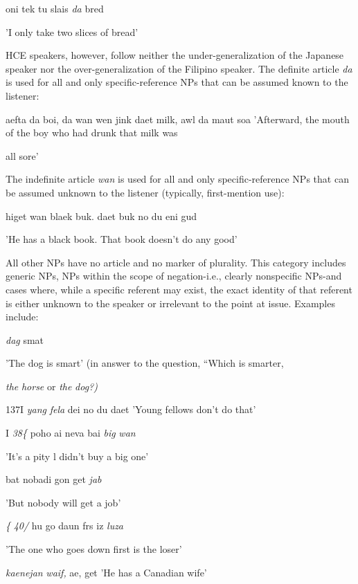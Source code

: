 \ea\label{ex:33}
oni tek tu slais \textit{da} bred
\glt
\z

'I only take two slices of bread'

HCE speakers, however, follow neither the under-generalization of the Japanese speaker nor the over-generalization of the Filipino speaker. The definite article \textit{da} is used for all and only specific-refer\-ence NPs that can be assumed known to the listener:

\ea\label{ex:34}
aefta da boi, da wan wen jink daet milk, awl da maut soa 'Afterward, the mouth of the boy who had drunk that milk was
\glt
\z

all sore'

The indefinite article \textit{wan} is used for all and only specific-reference NPs that can be assumed unknown to the listener (typically, first-mention use):

\ea\label{ex:35}
higet wan blaek buk. daet buk no du eni gud
\glt
\z

'He has a black book. That book doesn't do any good'

All other NPs have no article and no marker of plurality. This category includes generic NPs, NPs within the scope of negation-i.e., clearly nonspecific NPs-and cases where, while a specific referent may exist, the exact identity of that referent is either unknown to the speaker or irrelevant to the point at issue. Examples include:

\ea\label{ex:36}
\textit{dag} smat
\glt
\z

'The dog is smart' (in answer to the question, ``Which is smarter,

\textit{the} \textit{horse} or \textit{the} \textit{dog?{\textquotedbl})}

137I \textit{ya}\textit{n}\textit{g} \textit{fela} dei no du daet 'Young fellows don't do that'


I \textit{38\{ }poho ai neva bai \textit{big} \textit{wan}

'It's a pity l didn't buy a big one'

\ea\label{ex:39}
bat nobadi gon get \textit{jab}
\glt
\z

'But nobody will get a job'

\textit{\{} \textit{40/ }hu go daun frs iz \textit{luza}

'The one who goes down first is the loser'

\ea\label{ex:41}
\textit{kaenejan} \textit{waif,} ae, get 'He has a Canadian wife'
\glt
\z

